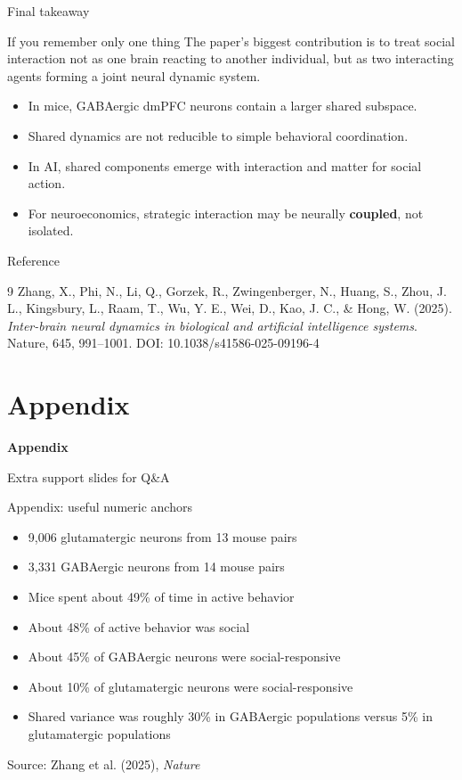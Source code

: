 \documentclass[aspectratio=169,11pt]{beamer}
\newcommand{\papersource}{\vspace{0.25em}\hfill{\scriptsize Source: Zhang et al. (2025), \textit{Nature}}}
\newcommand{\sectiondivider}[2]{
  \begin{frame}[plain]
    \vfill
    {\color{accentblue}\LARGE\bfseries #1\par}
    \vspace{0.5em}
    {\large #2\par}
    \vfill
  \end{frame}
}
\begin{document}
\begin{frame}{Final takeaway}
\begin{alertblock}{If you remember only one thing}
The paper's biggest contribution is to treat social interaction not as one brain reacting to another individual, but as two interacting agents forming a joint neural dynamic system.
\end{alertblock}
\vspace{0.5em}
\begin{itemize}
  \item In mice, GABAergic dmPFC neurons contain a larger shared subspace.
  \item Shared dynamics are not reducible to simple behavioral coordination.
  \item In AI, shared components emerge with interaction and matter for social action.
  \item For neuroeconomics, strategic interaction may be neurally \textbf{coupled}, not isolated.
\end{itemize}
\end{frame}

\begin{frame}{Reference}
\small
\begin{thebibliography}{9}
Zhang, X., Phi, N., Li, Q., Gorzek, R., Zwingenberger, N., Huang, S., Zhou, J. L., Kingsbury, L., Raam, T., Wu, Y. E., Wei, D., Kao, J. C., \& Hong, W. (2025).\\
\textit{Inter-brain neural dynamics in biological and artificial intelligence systems}.\\
Nature, 645, 991--1001. DOI: 10.1038/s41586-025-09196-4
\end{thebibliography}
\end{frame}

\appendix
\section{Appendix}
\sectiondivider{Appendix}{Extra support slides for Q\&A}

\begin{frame}{Appendix: useful numeric anchors}
\begin{itemize}
  \item 9,006 glutamatergic neurons from 13 mouse pairs
  \item 3,331 GABAergic neurons from 14 mouse pairs
  \item Mice spent about 49\% of time in active behavior
  \item About 48\% of active behavior was social
  \item About 45\% of GABAergic neurons were social-responsive
  \item About 10\% of glutamatergic neurons were social-responsive
  \item Shared variance was roughly 30\% in GABAergic populations versus 5\% in glutamatergic populations
\end{itemize}
\papersource
\end{frame}
\end{document}
